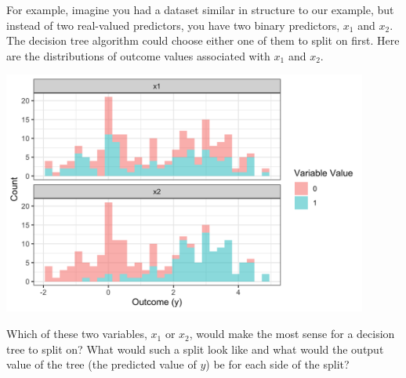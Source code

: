 For example, imagine you had a dataset similar in structure to our example, but instead of two real-valued predictors, you have two binary predictors, $x_1$ and $x_2$. The decision tree algorithm could choose either one of them to split on first. Here are the distributions of outcome values associated with $x_1$ and $x_2$. 

\begin{center}
\includegraphics[width=0.9\textwidth]{img/esl-reg-decision-tree-varsplit.png}
\end{center}

\begin{question}{}
Which of these two variables, $x_1$ or $x_2$, would make the most sense for a decision tree to split on? What would such a split look like and what would the output value of the tree (the predicted value of $y$) be for each side of the split?
\end{question}

